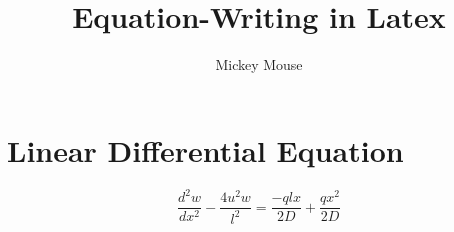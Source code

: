 \documentclass{article}
\title{Equation-Writing in Latex}
\author{Mickey Mouse}
\begin{document}
	\maketitle
	
	\section{Linear Differential Equation}
	\[ \frac{d^2w}{dx^2} - \frac{4u^2w}{l^2}
	= \frac{-qlx}{2D}+\frac{qx^2}{2D}  \]
	
\end{document}
